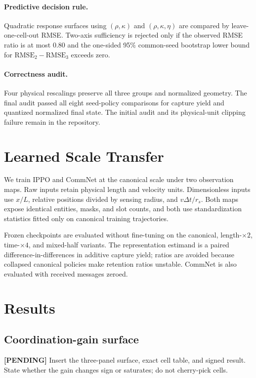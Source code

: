 \documentclass{article}
\newcommand{\rhoSNR}{\rho}
\newcommand{\kappaC}{\kappa}
\newcommand{\etaT}{\eta}
\newcommand{\pending}[1]{\textcolor{red!70!black}{\textbf{[PENDING]} #1}}
\begin{document}
\paragraph{Predictive decision rule.}
Quadratic response surfaces using $(\rhoSNR,\kappaC)$ and
$(\rhoSNR,\kappaC,\etaT)$ are compared by leave-one-cell-out RMSE. Two-axis
sufficiency is rejected only if the observed RMSE ratio is at most $0.80$ and
the one-sided 95\% common-seed bootstrap lower bound for
$\mathrm{RMSE}_{2}-\mathrm{RMSE}_{3}$ exceeds zero.

\paragraph{Correctness audit.}
Four physical rescalings preserve all three groups and normalized geometry.
The final audit passed all eight seed-policy comparisons for capture yield and
quantized normalized final state. The initial audit and its physical-unit
clipping failure remain in the repository.

\section{Learned Scale Transfer}

We train IPPO and CommNet at the canonical scale under two observation maps.
Raw inputs retain physical length and velocity units. Dimensionless inputs use
$x/L$, relative positions divided by sensing radius, and $v\Delta t/r_s$.
Both maps expose identical entities, masks, and slot counts, and both use
standardization statistics fitted only on canonical training trajectories.

Frozen checkpoints are evaluated without fine-tuning on the canonical,
length-$\times2$, time-$\times4$, and mixed-half variants. The representation
estimand is a paired difference-in-differences in additive capture yield; ratios
are avoided because collapsed canonical policies make retention ratios
unstable. CommNet is also evaluated with received messages zeroed.

\section{Results}

\subsection{Coordination-gain surface}
\pending{Insert the three-panel surface, exact cell table, and signed result.
State whether the gain changes sign or saturates; do not cherry-pick cells.}
\end{document}

